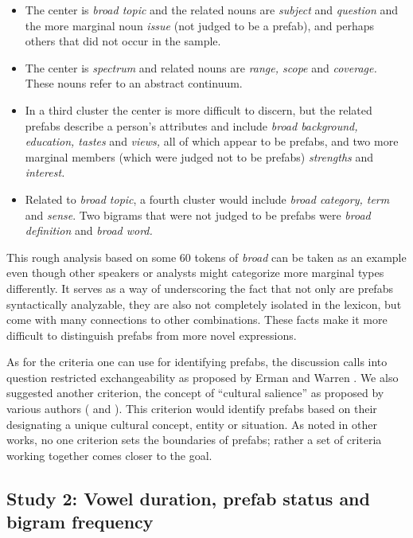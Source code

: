 \documentclass[output=paper]{langscibook}
\begin{document}
\begin{itemize}
\item The center is \textit{broad topic} and the related nouns are \textit{subject} and \textit{question} and the more marginal noun \textit{issue} (not judged to be a prefab), and perhaps others that did not occur in the sample.

\item The center is \textit{spectrum} and related nouns are \textit{range, scope} and \textit{coverage.} These nouns refer to an abstract continuum.

\item In a third cluster the center is more difficult to discern, but the related prefabs describe a person’s attributes and include \textit{broad background, education, tastes} and \textit{views,} all of which appear to be prefabs, and two more marginal members (which were judged not to be prefabs) \textit{strengths} and \textit{interest.}

\item Related to \textit{broad topic}, a fourth cluster would include \textit{broad category, term} and \textit{sense}. Two bigrams that were not judged to be prefabs were \textit{broad definition} and \textit{broad word.}

\end{itemize}

This rough analysis based on some 60 tokens of \textit{broad} can be taken as an example even though other speakers or analysts might categorize more marginal types differently. It serves as a way of underscoring the fact that not only are prefabs syntactically analyzable, they are also not completely isolated in the lexicon, but come with many connections to other combinations. These facts make it more difficult to distinguish prefabs from more novel expressions. 

As for the criteria one can use for identifying prefabs, the discussion calls into question restricted exchangeability as proposed by Erman and Warren \citet{ErmanWarren2000}. We also suggested another criterion, the concept of ``cultural salience'' as proposed by various authors (\citealt{Pawley1986} and \citealt{Hoffman2004}). This criterion would identify prefabs based on their designating a unique cultural concept, entity or situation. As noted in other works, no one criterion sets the boundaries of prefabs; rather a set of criteria working together comes closer to the goal.

\subsection{Study 2: Vowel duration, prefab status and bigram frequency}\label{sec:bybee:3.2}
\end{document}
